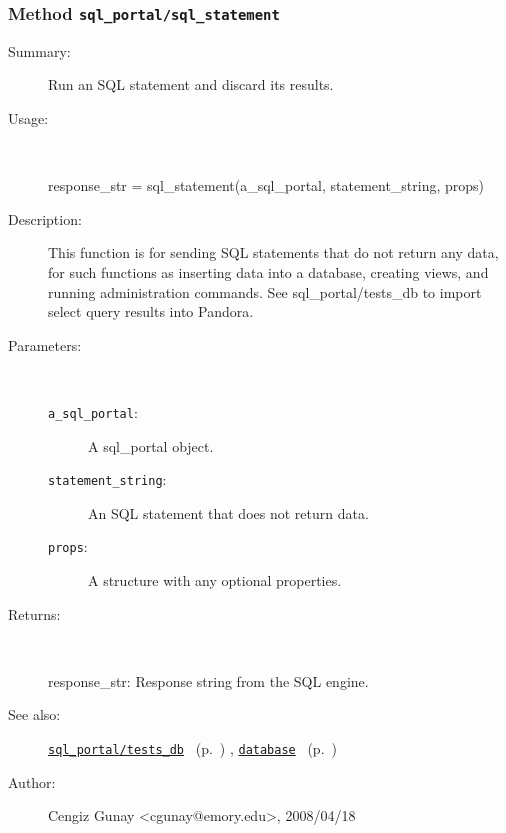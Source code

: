 \subsubsection[Method \texttt{sql\_statement}]{Method \texttt{sql\_portal/sql\_statement}}%
%
\label{ref_sql_portal__sql_statement}%
\hypertarget{ref_sql_portal__sql_statement}{}%
\begin{description}
\item[Summary:]Run an SQL statement and discard its results.
%
\item[Usage:]~%
\begin{lyxcode}%
response\_str = sql\_statement(a\_sql\_portal, statement\_string, props)
%
\end{lyxcode}%
%
\item[Description:]%
This function is for sending SQL statements that do not return any data,
 for such functions as inserting data into a database, creating views, and
 running administration commands. See sql\_portal/tests\_db to import select
 query results into Pandora.
\item[Parameters:]~
\begin{description}%
\item[\texttt{a\_sql\_portal}:]
 A sql\_portal object.
\item[\texttt{statement\_string}:]
 An SQL statement that does not return data.
\item[\texttt{props}:]
 A structure with any optional properties.
\end{description}%
%
\item[Returns:
]~

	response\_str: Response string from the SQL engine.
%
%
\item[See also:]%
\hyperlink{ref_sql_portal__tests_db}{\texttt{sql\_portal/tests\_db}}%
\ (p.~\pageref{ref_sql_portal__tests_db})%
%
, \hyperlink{ref_database}{\texttt{database}}%
\ (p.~\pageref{ref_database})%
%
%
\item[Author:]%
Cengiz Gunay <cgunay@emory.edu>, 2008/04/18
%
\end{description}
\methodline%
